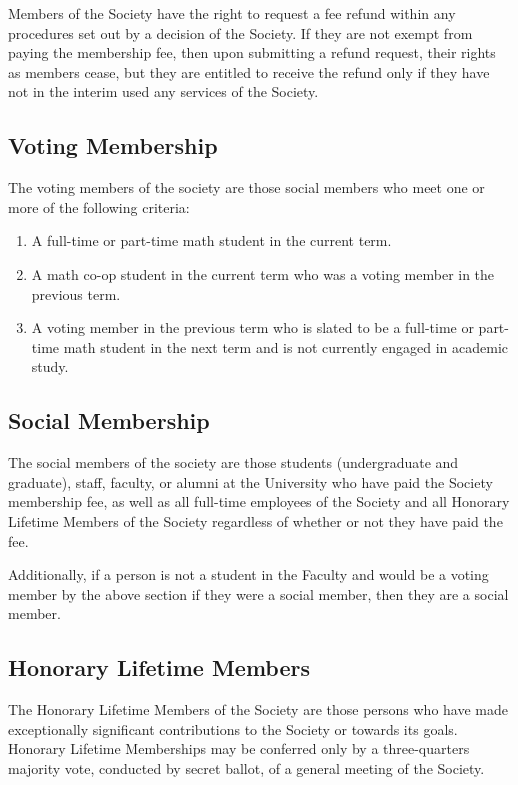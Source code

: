 Members of the Society have the right to request a fee refund within any
procedures set out by a decision of the Society. If they are not exempt from
paying the membership fee, then upon submitting a refund request, their rights
as members cease, but they are entitled to receive the refund only if they have
not in the interim used any services of the Society.

\subsection{Voting Membership}
The voting members of the society are those social members who meet one or more
of the following criteria:
\begin{enumerate}
  \item A full-time or part-time math student in the current term.
  \item A math co-op student in the current term who was a voting member in the
    previous term.
  \item A voting member in the previous term who is slated to be a full-time or
    part-time math student in the next term and is not currently engaged in
    academic study.
\end{enumerate}

\subsection{Social Membership}
The social members of the society are those students (undergraduate and
graduate), staff, faculty, or alumni at the University who have paid the Society
membership fee, as well as all full-time employees of the Society and all
Honorary Lifetime Members of the Society regardless of whether or not they have
paid the fee.

Additionally, if a person is not a student in the Faculty and would be a voting
member by the above section if they were a social member, then they are a social
member.

\subsection{Honorary Lifetime Members}
The Honorary Lifetime Members of the Society are those persons who have made
exceptionally significant contributions to the Society or towards its goals.
Honorary Lifetime Memberships may be conferred only by a three-quarters majority
vote, conducted by secret ballot, of a general meeting of the Society.

